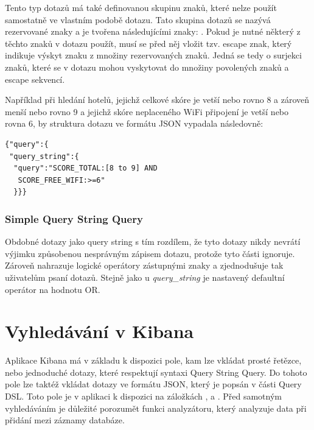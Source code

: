 \documentclass[czech,BP]{thesiskiv}
\begin{document}
Tento typ dotazů má také definovanou skupinu znaků, které nelze použít samostatně ve vlastním podobě dotazu. Tato skupina dotazů se nazývá rezervované znaky a je tvořena následujícími znaky: . Pokud je nutné některý z těchto znaků v dotazu použít, musí se před něj vložit tzv. escape znak, který indikuje výskyt znaku z množiny rezervovaných znaků. Jedná se tedy o surjekci znaků, které se v dotazu mohou vyskytovat do množiny povolených znaků a escape sekvencí.


Například při hledání hotelů, jejichž celkové skóre je vetší nebo rovno 8 a zároveň menší nebo rovno 9 a jejichž skóre neplaceného WiFi připojení je vetší nebo rovna 6, by struktura dotazu ve formátu JSON vypadala následovně:

\begin{lstlisting}[xleftmargin=0.2\textwidth]
{"query":{
 "query_string":{
  "query":"SCORE_TOTAL:[8 to 9] AND 
   SCORE_FREE_WIFI:>=6"
  }}}
\end{lstlisting}

	
\subsubsection{Simple Query String Query}
Obdobné dotazy jako query string s tím rozdílem, že tyto dotazy nikdy nevrátí výjimku způsobenou nesprávným zápisem dotazu, protože tyto části ignoruje. Zároveň nahrazuje logické operátory zástupnými znaky a zjednodušuje tak uživatelům psaní dotazů.  Stejně jako u \textit{query\_string} je nastavený defaultní operátor na hodnotu OR.

\section{Vyhledávání v Kibana}
Aplikace Kibana má v základu k dispozici pole, kam lze vkládat prosté řetězce, nebo  jednoduché dotazy, které respektují syntaxi Query String Query. Do tohoto pole lze taktéž vkládat dotazy ve formátu JSON, který je popsán v části Query DSL. Toto pole je v aplikaci k dispozici na záložkách ,  a . Před samotným vyhledáváním je důležité porozumět funkci analyzátoru, který analyzuje data při přidání mezi záznamy databáze.
\end{document}
